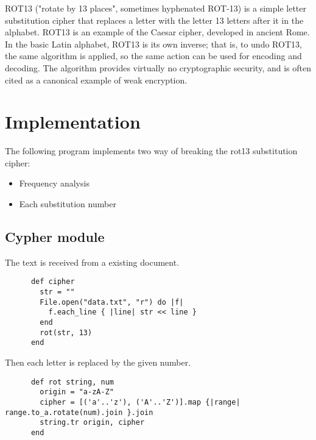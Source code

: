 \documentclass{article}
\begin{document}
  ROT13 ("rotate by 13 places", sometimes hyphenated ROT-13) is a simple letter substitution
  cipher that replaces a letter with the letter 13 letters after it in the alphabet.
  ROT13 is an example of the Caesar cipher, developed in ancient Rome. \\

 In the basic Latin alphabet, ROT13 is its own inverse; that is, to undo ROT13, the same algorithm is applied, so the same action can be used for encoding and decoding.
 The algorithm provides virtually no cryptographic security, and is often cited as a canonical example of weak encryption.


  \section{Implementation}

  The following program implements two way of breaking the
  rot13  substitution cipher:

  \begin{itemize}
      \item Frequency analysis
      \item Each substitution number
  \end{itemize}

  \subsection{Cypher module}

  The text is received from a existing document.

    \begin{lstlisting}
      def cipher
        str = ""
        File.open("data.txt", "r") do |f|
          f.each_line { |line| str << line }
        end
        rot(str, 13)
      end
    \end{lstlisting}

    Then each letter is replaced by the given number.

    \begin{lstlisting}
      def rot string, num
        origin = "a-zA-Z"
        cipher = [('a'..'z'), ('A'..'Z')].map {|range| range.to_a.rotate(num).join }.join
        string.tr origin, cipher
      end
    \end{lstlisting}
\end{document}
